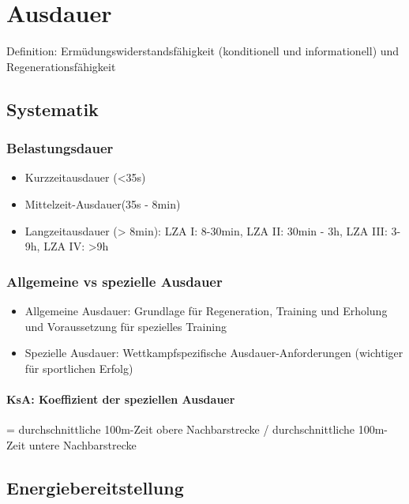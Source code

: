 
\section{Ausdauer}
Definition: Ermüdungswiderstandsfähigkeit (konditionell und informationell) und Regenerationsfähigkeit

\subsection{Systematik}
\subsubsection{Belastungsdauer}
\begin{itemize}
  \item Kurzzeitausdauer (<35s)
  \item Mittelzeit-Ausdauer(35s - 8min)
  \item Langzeitausdauer (> 8min): LZA I: 8-30min, LZA II: 30min - 3h, LZA III: 3-9h, LZA IV: >9h
\end{itemize}

\subsubsection{Allgemeine vs spezielle Ausdauer}
\begin{itemize}
  \item Allgemeine Ausdauer: Grundlage für Regeneration, Training und Erholung und Voraussetzung für spezielles Training
  \item Spezielle Ausdauer: Wettkampfspezifische Ausdauer-Anforderungen (wichtiger für sportlichen Erfolg)
\end{itemize}

\paragraph{KsA: Koeffizient der speziellen Ausdauer}
= durchschnittliche 100m-Zeit obere Nachbarstrecke / durchschnittliche 100m-Zeit untere Nachbarstrecke

\subsection{Energiebereitstellung}
